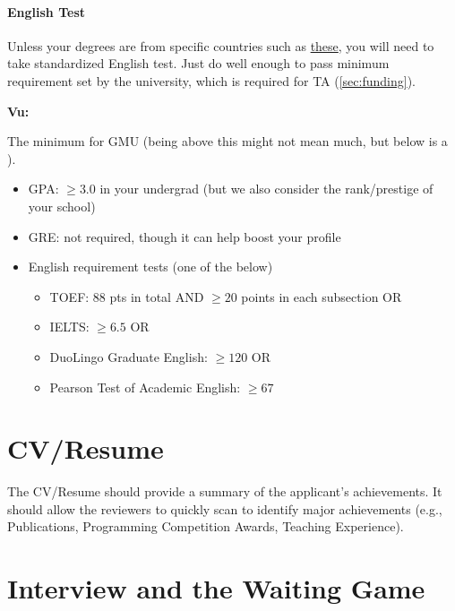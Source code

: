 \documentclass[oneside,11pt]{memoir}
\newenvironment{commentbox}[1][]{
  \small
  \begin{mybox}
    {\small \textbf{#1}}
  }{
  \end{mybox}
}
\newcommand{\red}[1]{{\color{red}{#1}}}
\begin{document}
\paragraph{English Test} Unless your degrees are from specific countries such as \href{https://github.com/dynaroars/dynaroars.github.io/wiki/About-GMU#standard-tests-waiver-eligible-countries}{these}, you will need to
take standardized English test. Just do well enough to pass minimum requirement set by the university, which is required for TA (\autoref{sec:funding}).

\begin{commentbox}[Vu:]
  The minimum for GMU (being above this might not mean much, but below is a \red{red flag}).
  \begin{itemize}
    \item GPA: $\ge 3.0$ in your undergrad (but we also consider the rank/prestige of your school)
    \item GRE: not required, though it can help boost your profile
    \item English requirement tests (one of the below)
          \begin{itemize}
            \item TOEF: 88 pts in total AND $\ge 20$ points in each subsection OR
            \item IELTS: $\ge 6.5$ OR
            \item DuoLingo Graduate English: $\ge 120$ OR
            \item Pearson Test of Academic English: $\ge 67$
          \end{itemize}
  \end{itemize}
\end{commentbox}


\section{CV/Resume}
The CV/Resume should provide a summary of the applicant's achievements.  It should allow the reviewers to quickly scan to identify major achievements (e.g., Publications, Programming Competition Awards, Teaching Experience).

\section{Interview and the Waiting Game}\label{sec:interview}
\end{document}
